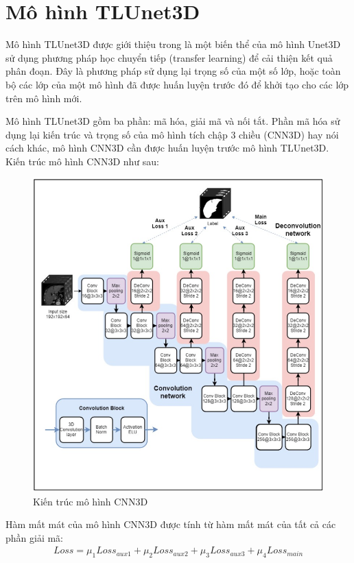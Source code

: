 \section{Mô hình TLUnet3D} \label{bg-TLUnet3D}
Mô hình TLUnet3D được giới thiệu trong \cite{LV_LIVER} là một biến thể của mô hình Unet3D sử dụng phương pháp học chuyển tiếp (transfer learning) để cải thiện kết quả phân đoạn. Đây là phương pháp sử dụng lại trọng số của một số lớp, hoặc toàn bộ các lớp của một mô hình đã được huấn luyện trước đó để khởi tạo cho các lớp trên mô hình mới.\par
Mô hình TLUnet3D gồm ba phần: mã hóa, giải mã và nối tắt. Phần mã hóa sử dụng lại kiến trúc và trọng số của mô hình tích chập 3 chiều (CNN3D) hay nói cách khác, mô hình CNN3D cần được huấn luyện trước mô hình TLUnet3D. Kiến trúc mô hình CNN3D như sau:
\begin{figure}[H]
    \centering
    \includegraphics[width=12cm]{images/liver/CNN3D/CNN3D.png}
    \caption{Kiến trúc mô hình CNN3D\cite{LV_LIVER}}
    \label{fig:CNN3D}
\end{figure}
Hàm mất mát của mô hình CNN3D được tính từ hàm mất mát của tất cả các phần giải mã:
\begin{align}
    \label{LossCNN3D}
    Loss = \mu_{1}Loss_{aux1} + \mu_{2}Loss_{aux2} + \mu_{3}Loss_{aux3} + \mu_{4}Loss_{main}
\end{align}
